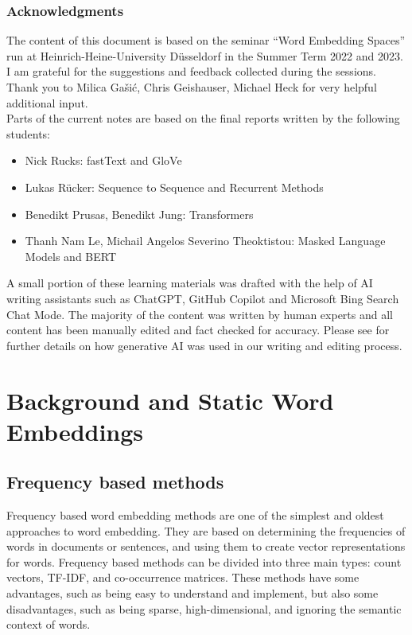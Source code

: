 \documentclass[11pt, a4paper]{amsart}
\begin{document}
\subsubsection{Acknowledgments}

The content of this document is based on the seminar ``Word Embedding Spaces'' run at Heinrich-Heine-University Düsseldorf in the Summer Term 2022 and 2023.
I am grateful for the suggestions and feedback collected during the sessions. Thank you to Milica Gašić, Chris Geishauser, Michael Heck for very helpful additional input. \\
Parts of the current notes are based on the final reports written by the following students:
\begin{itemize}
	\item Nick Rucks: fastText and GloVe
	\item Lukas Rücker: Sequence to Sequence and Recurrent Methods
	\item Benedikt Prusas, Benedikt Jung: Transformers
	\item Thanh Nam Le, Michail Angelos Severino Theoktistou: Masked Language Models and BERT
\end{itemize}

A small portion of these learning materials was drafted with the help of AI writing assistants such as ChatGPT, GitHub Copilot and Microsoft Bing Search Chat Mode.
The majority of the content was written by human experts and all content has been manually edited and fact checked for accuracy.
Please see  for further details on how generative AI was used in our writing and editing process. \\

\section{Background and Static Word Embeddings}
\label{sec:static_word_embeddings}


\subsection{Frequency based methods}

Frequency based word embedding methods are one of the simplest and oldest approaches to word embedding.
They are based on determining the frequencies of words in documents or sentences, and using them to create vector representations for words.
Frequency based methods can be divided into three main types: count vectors, TF-IDF, and co-occurrence matrices.
These methods have some advantages, such as being easy to understand and implement, but also some disadvantages, such as being sparse, high-dimensional, and ignoring the semantic context of words.
\end{document}
